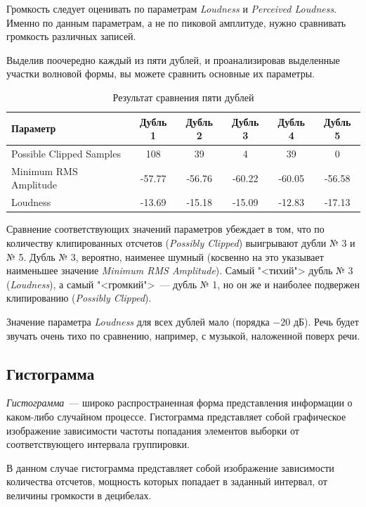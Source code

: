 \documentclass[oneside, final, 14pt]{extreport}
\begin{document}
Громкость следует оценивать по параметрам \textit{Loudness} и \textit{Perceived Loudness}. Именно по данным параметрам, а не по пиковой амплитуде, нужно сравнивать громкость различных записей.

Выделив поочередно каждый из пяти дублей, и проанализировав выделенные участки волновой формы, вы можете сравнить основные их параметры.

\begin{table}[ht]
  \caption{Результат сравнения пяти дублей}
  \begin{center}
  \begin{tabular}{|l|c|c|c|c|c|}
    \hline Параметр 				& Дубль 1 	& Дубль 2 	& Дубль 3 	& Дубль 4 	& Дубль 5\\
    \hline Possible Clipped Samples & 108 		& 39 		& 4 		& 39 		& 0\\
    \hline Minimum RMS Amplitude 	& -57.77	& -56.76    & -60.22	& -60.05	& -56.58\\    
    \hline Loudness 				& -13.69	& -15.18	& -15.09	& -12.83	& -17.13\\    
    \hline 
  \end{tabular}
  \end{center}  
  \label{table-fivedoubles-01}
\end{table}

Сравнение соответствующих значений параметров убеждает в том, что по количеству клипированных отсчетов (\textit{Possibly Clipped}) выигрывают дубли № 3 и № 5. Дубль № 3, вероятно, наименее шумный (косвенно на это указывает наименьшее значение \textit{Minimum RMS Amplitude}). Самый "<тихий"> дубль № 3 (\textit{Loudness}), а самый "<громкий">~--- дубль № 1, но он же и наиболее подвержен клипированию (\textit{Possibly Clipped}).

Значение параметра \textit{Loudness} для всех дублей мало (порядка $-20$ дБ). Речь будет звучать очень тихо по сравнению, например, с музыкой, наложенной поверх речи.

\subsection{Гистограмма}
\textit{Гистограмма}~--- широко распространенная форма представления информации о каком-либо случайном процессе. Гистограмма представляет собой графическое изображение зависимости частоты попадания элементов выборки от соответствующего интервала группировки.

В данном случае гистограмма представляет собой изображение зависимости количества отсчетов, мощность которых попадает в заданный интервал, от величины громкости в децибелах.
\end{document}
